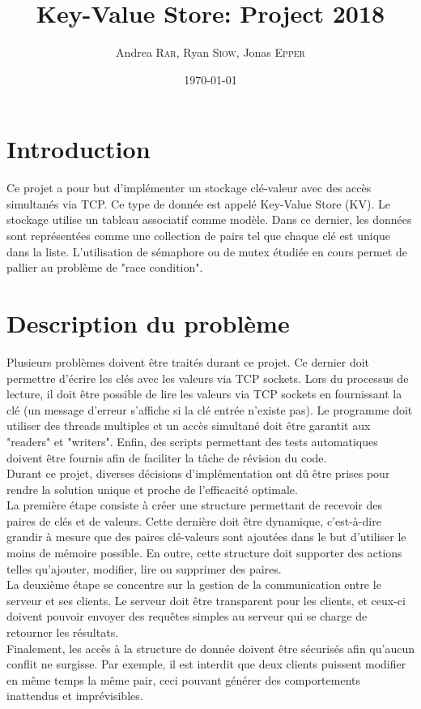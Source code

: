 \documentclass[11pt,a4paper]{article}
\title{\vspace{-10em}Key-Value Store: Project 2018}
\date{\today}
\author{Andrea \textsc{Rar}, Ryan \textsc{Siow}, Jonas \textsc{Epper}}
\newcommand{\emailurl}[1]{\href{mailto:#1}{#1}}
\renewcommand\maketitle{
\begin{center}%
    {\LARGE \thetitle \vspace \baselineskip \par}%
    {\large \theauthor \vspace \baselineskip \par}%
\myaddress
\emailurl{\myemail}
\end{center}
}
\begin{document}
\maketitle
\thispagestyle{empty}

\renewcommand{\contentsname}{\large Table des matières}
\renewcommand{\baselinestretch}{0.75}\normalsize
\tableofcontents %
\newpage
\section{Introduction}
Ce projet a pour but d'implémenter un stockage clé-valeur avec des accès simultanés via TCP. Ce type de donnée est appelé Key-Value Store (KV). Le stockage utilise un tableau associatif comme modèle. Dans ce dernier, les données sont représentées comme une collection de pairs tel que chaque clé est unique dans la liste. L'utilisation de sémaphore ou de mutex étudiée en cours permet de pallier au problème de "race condition". 

\section{Description du problème}
Plusieurs problèmes doivent être traités durant ce projet. Ce dernier doit permettre d'écrire les clés avec les valeurs via TCP sockets. Lors du processus de lecture, il doit être possible de lire les valeurs via TCP sockets en fournissant la clé (un message d'erreur s'affiche si la clé entrée n'existe pas). Le programme doit utiliser des threads multiples et un accès simultané doit être garantit aux "readers" et "writers". Enfin, des scripts permettant des tests automatiques doivent être fournis afin de faciliter la tâche de révision du code.\\
Durant ce projet, diverses décisions d'implémentation ont dû être prises pour rendre la solution unique et proche de l'efficacité optimale.\\
La première étape consiste à créer une structure permettant de recevoir des paires de clés et de valeurs. Cette dernière doit être dynamique, c'est-à-dire grandir à mesure que des paires clé-valeurs sont ajoutées dans le but d'utiliser le moins de mémoire possible. En outre, cette structure doit supporter des actions telles qu'ajouter, modifier, lire ou supprimer des paires.\\
La deuxième étape se concentre sur la gestion de la communication entre le serveur et ses clients. Le serveur doit être transparent pour les clients, et ceux-ci doivent pouvoir envoyer des requêtes simples au serveur qui se charge de retourner les résultats.\\
Finalement, les accès à la structure de donnée doivent être sécurisés afin qu'aucun conflit ne surgisse. Par exemple, il est interdit que deux clients puissent modifier en même temps la même pair, ceci pouvant générer des comportements inattendus et imprévisibles.
\end{document}
